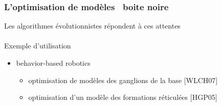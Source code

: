 \documentclass{beamer}
\begin{document}
\begin{frame}
\frametitle{L'optimisation de modèles \og~boite noire~\fg}
Les algorithmes évolutionnistes répondent à ces attentes\\
~\\
Exemple d'utilisation %
\begin{itemize}
    \item behavior-based robotics
    \begin{itemize}
        \item optimisation de modèles des ganglions de la base $[$WLCH07$]$
        \item optimisation d'un modèle des formations réticulées $[$HGP05$]$
    \end{itemize}
\end{itemize}
\end{frame}
\end{document}
